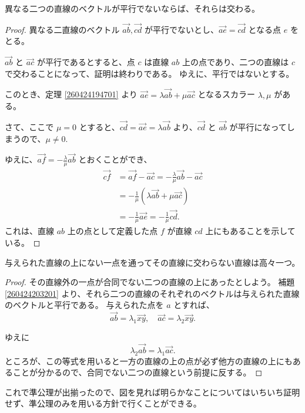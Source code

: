 
\begin{lmm}\label{260424203201}
  異なる二つの直線のベクトルが平行でないならば、それらは交わる。
\end{lmm}

\begin{proof}
  異なる二直線のベクトル \(\overrightarrow{ab},\overrightarrow{cd}\) が平行でないとし、\(\overrightarrow{ae}=\overrightarrow{cd}\) となる点 \(e\) をとる。

  \(\overrightarrow{ab}\) と \(\overrightarrow{ac}\) が平行であるとすると、点 \(c\) は直線 \(ab\) 上の点であり、二つの直線は \(c\) で交わることになって、証明は終わりである。
  ゆえに、平行ではないとする。

  このとき、定理 \ref{260424194701} より \(\overrightarrow{ae}=\lambda\overrightarrow{ab}+\mu\overrightarrow{ac}\) となるスカラー \(\lambda,\mu\) がある。

  さて、ここで \(\mu=0\) とすると、\(\overrightarrow{cd}=\overrightarrow{ae}=\lambda\overrightarrow{ab}\) より、\(\overrightarrow{cd}\) と \(\overrightarrow{ab}\) が平行になってしまうので、\(\mu\neq 0.\)

  ゆえに、\(\displaystyle \overrightarrow{af}=-\frac{\lambda}{\mu}\overrightarrow{ab}\) とおくことができ、
  \begin{align*}
    \overrightarrow{cf} &=\overrightarrow{af}-\overrightarrow{ac}=-\frac{\lambda}{\mu}\overrightarrow{ab}-\overrightarrow{ac} \\
                        &=-\frac{1}{\mu}(\lambda\overrightarrow{ab}+\mu\overrightarrow{ac}) \\
                        &=-\frac{1}{\mu}\overrightarrow{ae}=-\frac{1}{\mu}\overrightarrow{cd}.
  \end{align*}
  これは、直線 \(ab\) 上の点として定義した点 \(f\) が直線 \(cd\) 上にもあることを示している。
\end{proof}


\begin{semi}[平行線の唯一性の公理]
  与えられた直線の上にない一点を通ってその直線に交わらない直線は高々一つ。
\end{semi}

\begin{proof}
  その直線外の一点が合同でない二つの直線の上にあったとしよう。
  補題 \ref{260424203201} より、それら二つの直線のそれぞれのベクトルは与えられた直線のベクトルと平行である。
  与えられた点を \(a\) とすれば、
  \[\overrightarrow{ab}=\lambda_1\overrightarrow{xy},\quad \overrightarrow{ac}=\lambda_2\overrightarrow{xy}.\]

  ゆえに
  \[\lambda_2\overrightarrow{ab}=\lambda_1\overrightarrow{ac}.\]
  ところが、この等式を用いると一方の直線の上の点が必ず他方の直線の上にもあることが分かるので、合同でない二つの直線という前提に反する。
\end{proof}

これで準公理が出揃ったので、図を見れば明らかなことについてはいちいち証明せず、準公理のみを用いる方針で行くことができる。
